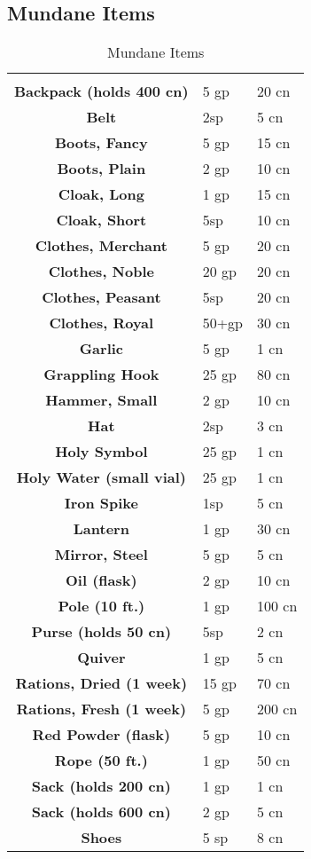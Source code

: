 \begin{multicols*}{2}
\section{Mundane Items}
\begin {table}[H]
  \caption{Mundane Items}
	\begin{tabularx}{\columnwidth}{>{\bfseries}cYY}
		 &  & \\
		Backpack (holds 400 cn) & 5 gp & 20 cn\\
		Belt & 2sp & 5 cn\\
		Boots, Fancy & 5 gp & 15 cn\\
		Boots, Plain & 2 gp & 10 cn\\
		Cloak, Long & 1 gp & 15 cn\\
		Cloak, Short & 5sp & 10 cn\\
		Clothes, Merchant & 5 gp & 20 cn\\
		Clothes, Noble & 20 gp & 20 cn\\
		Clothes, Peasant & 5sp & 20 cn\\
		Clothes, Royal & 50+gp & 30 cn\\
		Garlic & 5 gp & 1 cn\\
		Grappling Hook & 25 gp & 80 cn\\
		Hammer, Small & 2 gp & 10 cn\\
		Hat & 2sp & 3 cn\\
		Holy Symbol & 25 gp & 1 cn\\
		Holy Water (small vial) & 25 gp & 1 cn\\
		Iron Spike & 1sp & 5 cn\\
		Lantern & 1 gp & 30 cn\\
		Mirror, Steel & 5 gp & 5 cn\\
		Oil (flask) & 2 gp & 10 cn\\
		Pole (10 ft.) & 1 gp & 100 cn\\
		Purse (holds 50 cn) & 5sp & 2 cn\\
		Quiver & 1 gp & 5 cn\\
		Rations, Dried (1 week) & 15 gp & 70 cn\\
		Rations, Fresh (1 week) & 5 gp & 200 cn\\
		Red Powder (flask) & 5 gp & 10 cn\\
		Rope (50 ft.) & 1 gp & 50 cn\\
		Sack (holds 200 cn) & 1 gp & 1 cn\\
		Sack (holds 600 cn) & 2 gp & 5 cn\\
		Shoes & 5 sp & 8 cn\\

\end{tabularx}
\end{table}
\end{multicols*}

